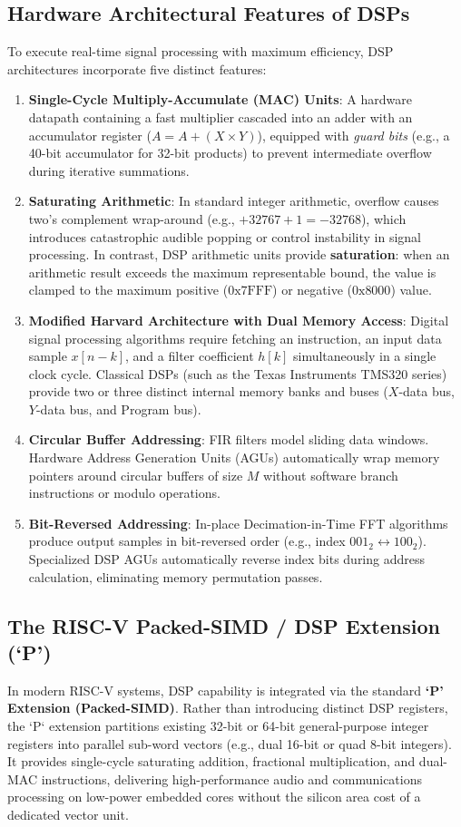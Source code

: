 \subsection{Hardware Architectural Features of DSPs}
To execute real-time signal processing with maximum efficiency, DSP architectures incorporate five distinct features:
\begin{enumerate}
    \item \textbf{Single-Cycle Multiply-Accumulate (MAC) Units}: A hardware datapath containing a fast multiplier cascaded into an adder with an accumulator register ($A = A + (X \times Y)$), equipped with \emph{guard bits} (e.g., a 40-bit accumulator for 32-bit products) to prevent intermediate overflow during iterative summations.
    \item \textbf{Saturating Arithmetic}: In standard integer arithmetic, overflow causes two's complement wrap-around (e.g., $+32767 + 1 = -32768$), which introduces catastrophic audible popping or control instability in signal processing. In contrast, DSP arithmetic units provide \textbf{saturation}: when an arithmetic result exceeds the maximum representable bound, the value is clamped to the maximum positive ($0\text{x}7\text{FFF}$) or negative ($0\text{x}8000$) value.
    \item \textbf{Modified Harvard Architecture with Dual Memory Access}: Digital signal processing algorithms require fetching an instruction, an input data sample $x[n-k]$, and a filter coefficient $h[k]$ simultaneously in a single clock cycle. Classical DSPs (such as the Texas Instruments TMS320 series) provide two or three distinct internal memory banks and buses ($X$-data bus, $Y$-data bus, and Program bus).
    \item \textbf{Circular Buffer Addressing}: FIR filters model sliding data windows. Hardware Address Generation Units (AGUs) automatically wrap memory pointers around circular buffers of size $M$ without software branch instructions or modulo operations.
    \item \textbf{Bit-Reversed Addressing}: In-place Decimation-in-Time FFT algorithms produce output samples in bit-reversed order (e.g., index $001_2 \leftrightarrow 100_2$). Specialized DSP AGUs automatically reverse index bits during address calculation, eliminating memory permutation passes.
\end{enumerate}

\subsection{The RISC-V Packed-SIMD / DSP Extension (`P')}
In modern RISC-V systems, DSP capability is integrated via the standard \textbf{`P' Extension (Packed-SIMD)}. Rather than introducing distinct DSP registers, the `P` extension partitions existing 32-bit or 64-bit general-purpose integer registers into parallel sub-word vectors (e.g., dual 16-bit or quad 8-bit integers). It provides single-cycle saturating addition, fractional multiplication, and dual-MAC instructions, delivering high-performance audio and communications processing on low-power embedded cores without the silicon area cost of a dedicated vector unit.


